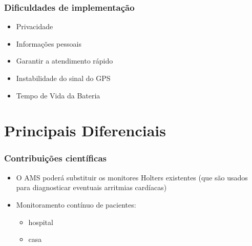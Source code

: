 \documentclass{beamer}
\begin{document}

\begin{frame}
\frametitle{Dificuldades de implementação}

	\begin{itemize}
		\item Privacidade
		\item Informações pessoais
		\item Garantir a atendimento rápido
		\item Instabilidade do sinal do GPS
		\item Tempo de Vida da Bateria
	\end{itemize}
\end{frame}

\section{Principais Diferenciais}

\begin{frame}
\frametitle{Contribuições científicas}

	\begin{itemize}
		\item O AMS poderá substituir os monitores Holters existentes (que são usados para diagnosticar eventuais arritmias cardíacas)
		\item Monitoramento contínuo de pacientes:
		\begin{itemize}
			\item hospital
			\item casa
		\end{itemize}
	\end{itemize}
\end{frame}
\end{document}
